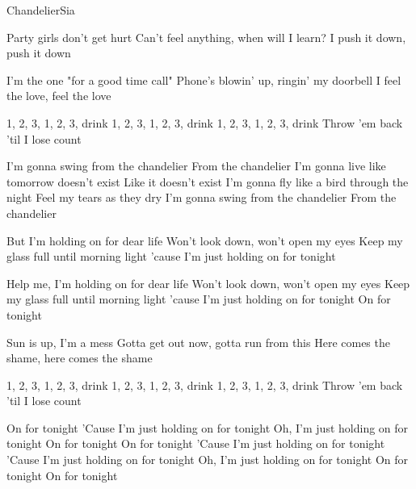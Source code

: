 \documentclass[a4paper,11pt,french]{article}
\begin{document}
\begin{Song}{Chandelier}{Sia}
\begin{multicols}{2}

\begin{Verse}
Party girls don't get hurt
Can't feel anything, when will I learn?
I push it down, push it down
\espaceInterStrophe

I'm the one "for a good time call"
Phone's blowin' up, ringin' my doorbell
I feel the love, feel the love
\end{Verse}
\espaceInterStrophe

\begin{PreChorus}
1, 2, 3, 1, 2, 3, drink
1, 2, 3, 1, 2, 3, drink
1, 2, 3, 1, 2, 3, drink
Throw 'em back 'til I lose count
\end{PreChorus}	
\espaceInterStrophe

\begin{Chorus}
I'm gonna swing from the chandelier
From the chandelier
I'm gonna live like tomorrow doesn't exist
Like it doesn't exist
I'm gonna fly like a bird through the night
Feel my tears as they dry
I'm gonna swing from the chandelier
From the chandelier
\espaceInterStrophe

But I'm holding on for dear life
Won't look down, won't open my eyes
Keep my glass full until morning light
'cause I'm just holding on for tonight
\espaceInterStrophe

Help me, I'm holding on for dear life
Won't look down, won't open my eyes
Keep my glass full until morning light
'cause I'm just holding on for tonight
On for tonight
\end{Chorus}	
\vfill
\columnbreak

\begin{Verse}
Sun is up, I'm a mess
Gotta get out now, gotta run from this
Here comes the shame, here comes the shame
\end{Verse}
\espaceInterStrophe

\begin{PreChorus}
1, 2, 3, 1, 2, 3, drink
1, 2, 3, 1, 2, 3, drink
1, 2, 3, 1, 2, 3, drink
Throw 'em back 'til I lose count
\end{PreChorus}	
\espaceInterStrophe

\tochorus
\espaceInterStrophe

\begin{Chorus}
On for tonight
'Cause I'm just holding on for tonight
Oh, I'm just holding on for tonight
On for tonight
On for tonight
'Cause I'm just holding on for tonight
'Cause I'm just holding on for tonight
Oh, I'm just holding on for tonight
On for tonight
On for tonight
\end{Chorus}	


\end{multicols}
\end{Song}
\end{document}
